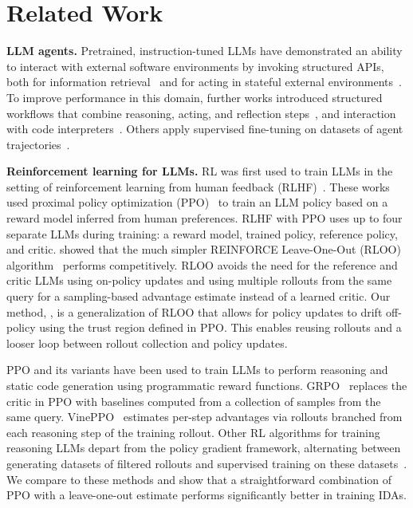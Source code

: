 \section{Related Work}
%
%
%
%
%
%
%
%
%
%
%
%
%
%
%
%
%
%
%
%
%


%

%

\textbf{LLM agents.}
Pretrained, instruction-tuned LLMs have demonstrated an ability to interact with external software environments by invoking structured APIs, both for information retrieval~\cite{nakano2021webgpt,schick2023toolformer} and for acting in stateful external environments~\cite{yao2020keep,yao2022webshop}.
To improve performance in this domain, further works introduced structured workflows that combine reasoning, acting, and reflection steps~\cite{yao2022react,shinn2024reflexion,kim2024language}, and  interaction with code interpreters~\cite{wang2024executable,yang2024intercode}. Others apply supervised fine-tuning on datasets of agent trajectories~\cite{chen2023fireact,qin2023toolllm,mitra2024agentinstruct}.

\textbf{Reinforcement learning for LLMs.}
RL was first used to train LLMs in the setting of reinforcement learning from human feedback (RLHF)~\cite{ziegler2019fine,stiennon2020learning,ouyang2022training}.
These works used proximal policy optimization (PPO)~\cite{schulman2017proximal} to train an LLM policy based on a reward model inferred from human preferences.
RLHF with PPO uses up to four separate LLMs during training: a reward model, trained policy, reference policy, and critic.
%
\citet{ahmadian2024back} showed that the much simpler REINFORCE Leave-One-Out (RLOO) algorithm~\cite{kool2019buy} performs competitively.
RLOO avoids the need for the reference and critic LLMs using on-policy updates and using multiple rollouts from the same query for a sampling-based advantage estimate instead of a learned critic.
Our method, \ours, is a generalization of RLOO that allows for policy updates to drift off-policy using the trust region defined in PPO.
This enables reusing rollouts and a looser loop between rollout collection and policy updates.

PPO and its variants have been used to train LLMs to perform reasoning and static code generation using programmatic reward functions. %
GRPO~\cite{shao2024deepseekmath,deepseekai2025deepseekr1} replaces the critic in PPO with baselines computed from a collection of samples from the same query.
VinePPO~\cite{kazemnejad2024vineppo} estimates per-step advantages via rollouts branched from each reasoning step of the training rollout.
Other RL algorithms for training reasoning LLMs depart from the policy gradient framework, alternating between generating datasets of filtered rollouts and supervised training on these datasets~\cite{singh2023beyond,havrilla2024teaching,yuan2023scaling}.
We compare to these methods and show that a straightforward combination of PPO with a leave-one-out estimate performs significantly better in training IDAs.
%

